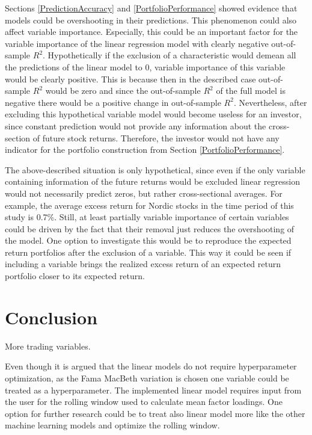 \documentclass[12pt]{article}
\begin{document}
Sections \ref{PredictionAccuracy} and \ref{PortfolioPerformance} showed evidence that models could be overshooting in their predictions. This phenomenon could also affect variable importance. Especially, this could be an important factor for the variable importance of the linear regression model with clearly negative out-of-sample $R^2$. Hypothetically if the exclusion of a characteristic would demean all the predictions of the linear model to 0, variable importance of this variable would be clearly positive. This is because then in the described case out-of-sample $R^2$ would be zero and since the out-of-sample $R^2$ of the full model is negative there would be a positive change in out-of-sample $R^2$. Nevertheless, after excluding this hypothetical variable model would become useless for an investor, since constant prediction would not provide any information about the cross-section of future stock returns. Therefore, the investor would not have any indicator for the portfolio construction from Section \ref{PortfolioPerformance}. \par

The above-described situation is only hypothetical, since even if the only variable containing information of the future returns would be excluded linear regression would not necessarily predict zeros, but rather cross-sectional averages. For example, the average excess return for Nordic stocks in the time period of this study is 0.7\%. Still, at least partially variable importance of certain variables could be driven by the fact that their removal just reduces the overshooting of the model. One option to investigate this would be to reproduce the expected return portfolios after the exclusion of a variable. This way it could be seen if including a variable brings the realized excess return of an expected return portfolio closer to its expected return. \par

\section{Conclusion}\label{Conclusion}

More trading variables.

Even though it is argued that the linear models do not require hyperparameter optimization, as the Fama MacBeth variation is chosen one variable could be treated as a hyperparameter. The implemented linear model requires input from the user for the rolling window used to calculate mean factor loadings. One option for further research could be to treat also linear model more like the other machine learning models and optimize the rolling window.
\end{document}
